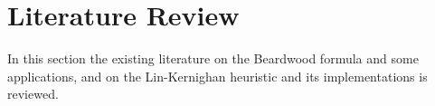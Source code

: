 \section{Literature Review}
In this section the existing literature on the Beardwood formula and some applications,
and on the Lin-Kernighan heuristic and its implementations is reviewed.




